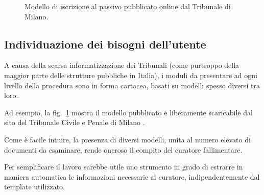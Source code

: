 \begin{figure}[H]
\centering
{}
\caption{Modello di iscrizione al passivo pubblicato online dal Tribunale di Milano.}
\label{fig:modello3}
\end{figure}


\subsection{Individuazione dei bisogni dell’utente}
A causa della scarsa informatizzazione dei Tribunali (come purtroppo della maggior parte delle strutture pubbliche in Italia), i moduli da presentare ad ogni livello della procedura sono in forma cartacea, basati su modelli spesso diversi tra loro.

Ad esempio, la fig.~\ref{fig:modello3} mostra il modello pubblicato e liberamente scaricabile dal sito del Tribunale Civile e Penale di Milano \cite{milano:modulistica}.

Come è facile intuire, la presenza di diversi modelli, unita al numero elevato di documenti da esaminare, rende oneroso il compito del curatore fallimentare.

Per semplificare il lavoro sarebbe utile uno strumento in grado di estrarre in maniera automatica le informazioni necessarie al curatore, indipendentemente dal template utilizzato.